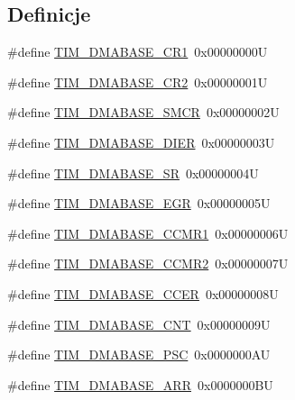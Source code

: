 \subsection*{Definicje}
\begin{DoxyCompactItemize}
\item 
\#define \hyperlink{group___t_i_m___d_m_a___base__address_ga97bbe74e5ae8680c020a6b0f760d8909}{T\+I\+M\+\_\+\+D\+M\+A\+B\+A\+S\+E\+\_\+\+C\+R1}~0x00000000U
\item 
\#define \hyperlink{group___t_i_m___d_m_a___base__address_ga53d60ce92015bb60d608e60c45b1fdda}{T\+I\+M\+\_\+\+D\+M\+A\+B\+A\+S\+E\+\_\+\+C\+R2}~0x00000001U
\item 
\#define \hyperlink{group___t_i_m___d_m_a___base__address_ga184ad86a4c6d48263f57d3e7106675c4}{T\+I\+M\+\_\+\+D\+M\+A\+B\+A\+S\+E\+\_\+\+S\+M\+CR}~0x00000002U
\item 
\#define \hyperlink{group___t_i_m___d_m_a___base__address_ga137d2e3858ae68333646fea6e04503da}{T\+I\+M\+\_\+\+D\+M\+A\+B\+A\+S\+E\+\_\+\+D\+I\+ER}~0x00000003U
\item 
\#define \hyperlink{group___t_i_m___d_m_a___base__address_gaf0da2213e3e7b6aaaa9b738ec85abc02}{T\+I\+M\+\_\+\+D\+M\+A\+B\+A\+S\+E\+\_\+\+SR}~0x00000004U
\item 
\#define \hyperlink{group___t_i_m___d_m_a___base__address_gaff6d230aafb918047d62e877d21b3bdc}{T\+I\+M\+\_\+\+D\+M\+A\+B\+A\+S\+E\+\_\+\+E\+GR}~0x00000005U
\item 
\#define \hyperlink{group___t_i_m___d_m_a___base__address_gac94d74bf77d5ce139c7fa6e0b8c2da44}{T\+I\+M\+\_\+\+D\+M\+A\+B\+A\+S\+E\+\_\+\+C\+C\+M\+R1}~0x00000006U
\item 
\#define \hyperlink{group___t_i_m___d_m_a___base__address_ga94f3dcf13674f397fee0ef816ad973cf}{T\+I\+M\+\_\+\+D\+M\+A\+B\+A\+S\+E\+\_\+\+C\+C\+M\+R2}~0x00000007U
\item 
\#define \hyperlink{group___t_i_m___d_m_a___base__address_ga64cb24a6d9d96d950be64586923c7447}{T\+I\+M\+\_\+\+D\+M\+A\+B\+A\+S\+E\+\_\+\+C\+C\+ER}~0x00000008U
\item 
\#define \hyperlink{group___t_i_m___d_m_a___base__address_gae711483dbf4f0eafb2505b8f823c4724}{T\+I\+M\+\_\+\+D\+M\+A\+B\+A\+S\+E\+\_\+\+C\+NT}~0x00000009U
\item 
\#define \hyperlink{group___t_i_m___d_m_a___base__address_gae23315a3ef1af7dccfbbfada90355bd8}{T\+I\+M\+\_\+\+D\+M\+A\+B\+A\+S\+E\+\_\+\+P\+SC}~0x0000000\+AU
\item 
\#define \hyperlink{group___t_i_m___d_m_a___base__address_ga3e08cd689d59f76dd5ca958a0ffdfb3d}{T\+I\+M\+\_\+\+D\+M\+A\+B\+A\+S\+E\+\_\+\+A\+RR}~0x0000000\+BU

\end{DoxyCompactItemize}
